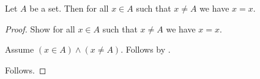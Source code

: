 \begin{proposition}\label{phase5_nested_set_induction}
    Let $A$ be a set.
    Then for all $x\in A$ such that $x\neq A$ we have $x = x$.
\end{proposition}
\begin{proof}
    Show for all $x\in A$ such that $x\neq A$ we have $x = x$.
    \begin{subproof}
        Assume $(x\in A)\land(x\neq A)$.
        Follows by \auto.
    \end{subproof}
    Follows.
\end{proof}
